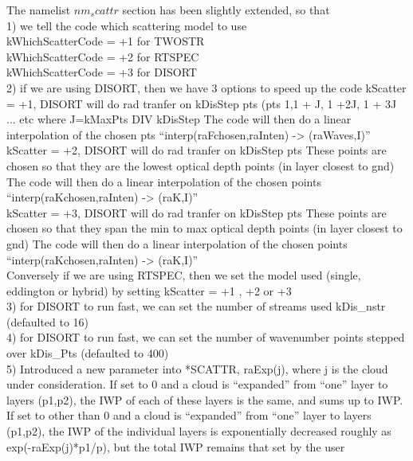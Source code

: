 \documentclass[12pt]{article}
\begin{document}
{{{{The namelist $nm_scattr$ section has been slightly extended, so that \\
  1) we tell the code which scattering model to use\\
          kWhichScatterCode = +1 for TWOSTR\\
          kWhichScatterCode = +2 for RTSPEC\\
          kWhichScatterCode = +3 for DISORT\\

  2) if we are using DISORT, then we have 3 options to speed up the code
       kScatter  = +1, DISORT will do rad tranfer on kDisStep pts 
                        (pts 1,1 + J, 1 +2J, 1 + 3J ... etc where 
                         J=kMaxPts DIV kDisStep
                   The code will then do a linear interpolation of the
                   chosen pts ``interp(raFchosen,raInten) -> (raWaves,I)'' \\
                       
       kScatter  = +2, DISORT will do rad tranfer on kDisStep pts 
                       These points are chosen so that they are the lowest 
                       optical depth points (in layer closest to gnd)
                   The code will then do a linear interpolation of the
                   chosen points ``interp(raKchosen,raInten) -> (raK,I)'' \\

       kScatter  = +3, DISORT will do rad tranfer on kDisStep pts 
                       These points are chosen so that they span the min
                       to max optical depth points (in layer closest to gnd)
                   The code will then do a linear interpolation of the
                   chosen points ``interp(raKchosen,raInten) -> (raK,I)''\\

     Conversely if we are using RTSPEC, then we set the model used (single, 
       eddington or hybrid) by setting kScatter  = +1 , +2 or +3 \\

  3) for DISORT to run fast, we can set the number of streams used
       kDis\_nstr  (defaulted to 16)\\

  4) for DISORT to run fast, we can set the number of wavenumber points 
     stepped over kDis\_Pts (defaulted to 400)\\

  5) Introduced a new parameter into *SCATTR, raExp(j), where j is
     the cloud under consideration. If set to 0 and a cloud is 
     ``expanded'' from ``one'' layer to layers (p1,p2), the IWP of each of 
     these layers is the same, and sums up to IWP. 
     If set to other than 0 and a cloud is ``expanded'' from ``one'' layer 
     to layers (p1,p2), the IWP of the individual layers is exponentially 
     decreased roughly as exp(-raExp(j)*p1/p), but the total IWP remains that
     set by the user

}}}}
\end{document}
